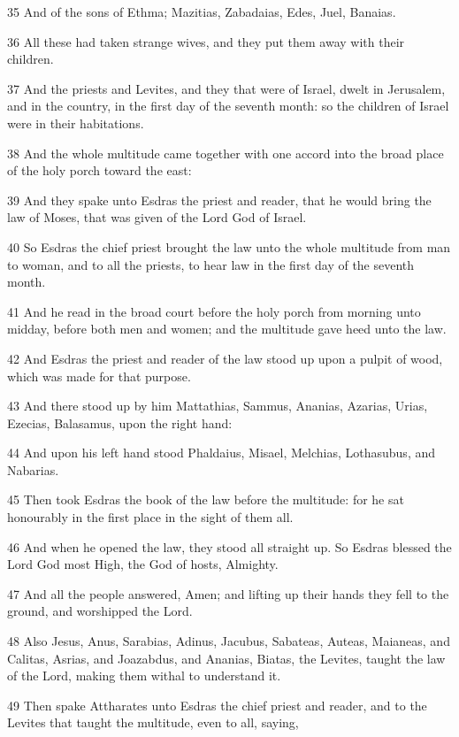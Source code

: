 \par 35 And of the sons of Ethma; Mazitias, Zabadaias, Edes, Juel, Banaias.
\par 36 All these had taken strange wives, and they put them away with their children.
\par 37 And the priests and Levites, and they that were of Israel, dwelt in Jerusalem, and in the country, in the first day of the seventh month: so the children of Israel were in their habitations.
\par 38 And the whole multitude came together with one accord into the broad place of the holy porch toward the east:
\par 39 And they spake unto Esdras the priest and reader, that he would bring the law of Moses, that was given of the Lord God of Israel.
\par 40 So Esdras the chief priest brought the law unto the whole multitude from man to woman, and to all the priests, to hear law in the first day of the seventh month.
\par 41 And he read in the broad court before the holy porch from morning unto midday, before both men and women; and the multitude gave heed unto the law.
\par 42 And Esdras the priest and reader of the law stood up upon a pulpit of wood, which was made for that purpose.
\par 43 And there stood up by him Mattathias, Sammus, Ananias, Azarias, Urias, Ezecias, Balasamus, upon the right hand:
\par 44 And upon his left hand stood Phaldaius, Misael, Melchias, Lothasubus, and Nabarias.
\par 45 Then took Esdras the book of the law before the multitude: for he sat honourably in the first place in the sight of them all.
\par 46 And when he opened the law, they stood all straight up. So Esdras blessed the Lord God most High, the God of hosts, Almighty.
\par 47 And all the people answered, Amen; and lifting up their hands they fell to the ground, and worshipped the Lord.
\par 48 Also Jesus, Anus, Sarabias, Adinus, Jacubus, Sabateas, Auteas, Maianeas, and Calitas, Asrias, and Joazabdus, and Ananias, Biatas, the Levites, taught the law of the Lord, making them withal to understand it.
\par 49 Then spake Attharates unto Esdras the chief priest and reader, and to the Levites that taught the multitude, even to all, saying,
